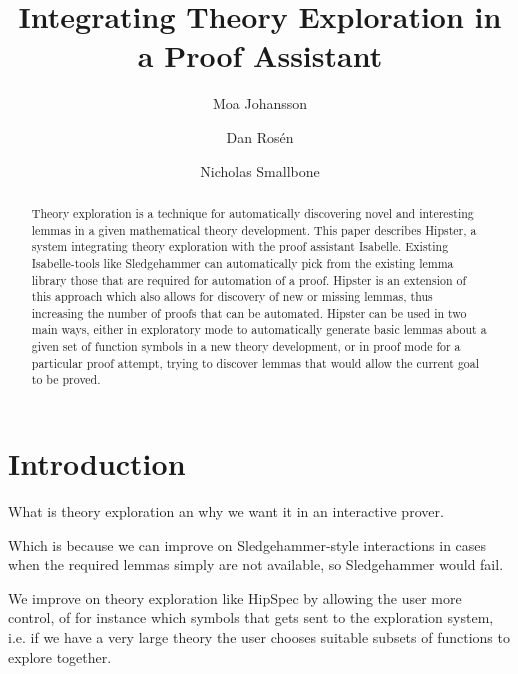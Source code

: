 \documentclass{llncs}
\begin{document}
\title{Integrating Theory Exploration in a Proof Assistant}

\author{Moa Johansson \and Dan Ros\'en \and Nicholas Smallbone}


\maketitle

\begin{abstract}
Theory exploration is a technique for automatically discovering novel and interesting lemmas in a given mathematical theory development. This paper describes Hipster, a system integrating theory exploration with the proof assistant Isabelle. 
Existing Isabelle-tools like Sledgehammer can automatically pick from the existing lemma library those that are required for automation of a proof. Hipster is an extension of this approach which also allows for discovery of new or missing lemmas, thus increasing the number of proofs that can be automated.
Hipster can be used in two main ways, either in exploratory mode to automatically generate basic lemmas about a given set of function symbols in a new theory development, or in proof mode for a particular proof attempt, trying to discover lemmas that would allow the current goal to be proved. 

\end{abstract}

\section{Introduction}
%

What is theory exploration an why we want it in an interactive prover. 

Which is because we can improve on Sledgehammer-style interactions in cases when the required lemmas simply are not available, so Sledgehammer would fail. 

We improve on theory exploration like HipSpec by allowing the user more control, of for instance which symbols that gets sent to the exploration system, i.e. if we have a very large theory the user chooses suitable subsets of functions to explore together.
\end{document}
